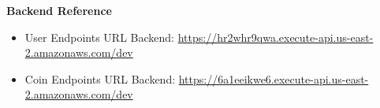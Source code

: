 \documentclass[a4paper, 11pt, titlepage]{article}
\begin{document}
\begin{landscape}
\textbf{Backend Reference}

\begin{itemize}
\item User Endpoints URL Backend: \href{https://hr2whr9qwa.execute-api.us-east-2.amazonaws.com/dev}{https://hr2whr9qwa.execute-api.us-east-2.amazonaws.com/dev}
\item Coin Endpoints URL Backend: \href{https://6a1eeikwe6.execute-api.us-east-2.amazonaws.com/dev}{https://6a1eeikwe6.execute-api.us-east-2.amazonaws.com/dev}
\end{itemize}

\end{landscape}
\restoregeometry
\end{document}
